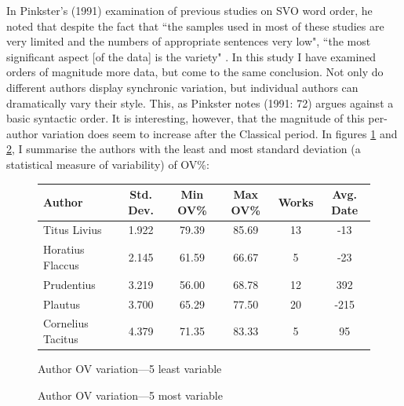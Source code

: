 \documentclass[11pt,a4paper]{scrartcl} %
\begin{document}
\noindent In Pinkster's (1991) examination of previous studies on SVO word order, he noted that despite the fact that ``the samples used in most of these studies are very limited and the numbers of appropriate sentences very low", ``the most significant aspect [of the data] is the variety" \cite[71--2]{pinkster}. In this study I have examined orders of magnitude more data, but come to the same conclusion. Not only do different authors display synchronic variation, but individual authors can dramatically vary their style. This, as Pinkster notes (1991: 72) argues against a basic syntactic order. It is interesting, however, that the magnitude of this per-author variation does seem to increase after the Classical period. In figures \ref{fig:author_sd_least} and \ref{fig:author_sd_most}, I summarise the authors with the least and most standard deviation (a statistical measure of variability) of OV\%:
\begin{figure}[H]
\caption{Author OV variation---5 least variable}
\label{fig:author_sd_least}
\phantom{x}
\centering
\begin{tabular}{ | l | c | c | c | c | c |}
\hline
Author & Std. Dev. & Min OV\% & Max OV\% & Works & Avg. Date\\
\hline\hline
Titus Livius & 1.922 & 79.39 & 85.69 & 13 & -13 \\
Horatius Flaccus & 2.145 & 61.59 & 66.67 &  5 &  -23 \\
Prudentius & 3.219 & 56.00 & 68.78 & 12 & 392 \\
Plautus & 3.700 & 65.29 & 77.50 & 20 & -215 \\
Cornelius Tacitus & 4.379 &71.35 & 83.33 & 5 & 95 \\
\hline
\end{tabular}
\end{figure}

\begin{figure}[H]
\caption{Author OV variation---5 most variable}
\label{fig:author_sd_most}
\phantom{x}
\centering
{}
\end{figure}
\end{document}
